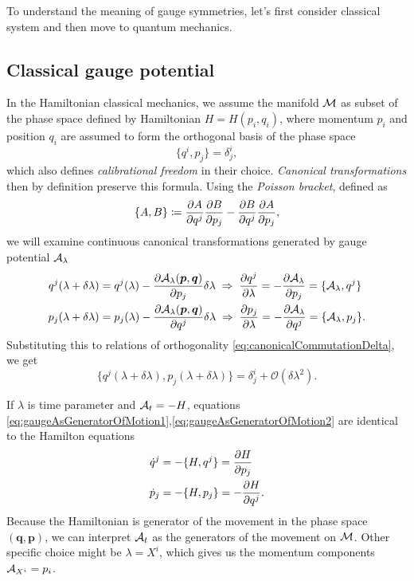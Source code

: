  To understand the meaning of gauge symmetries, let's first consider classical system and then move to quantum mechanics.


\subsection{Classical gauge potential}



In the Hamiltonian classical mechanics, we assume the manifold $\mathcal{M}$ as subset of the phase space defined by Hamiltonian $H=H(p_i,q_i)$, where momentum $p_i$ and position $q_i$ are assumed to form the orthogonal basis of the phase space
\begin{equation}
    \{q^i,p_j\}=\delta^i_j,
    \label{eq:canonicalCommutationDelta}
\end{equation}
which also defines \emph{calibrational freedom} in their choice. \emph{Canonical transformations} then by definition preserve this formula. Using the \emph{Poisson bracket}, defined as
\begin{equation}
    \{A,B\}\coloneqq \frac{\partial A}{\partial q^j}\frac{\partial B}{\partial p_j}-\frac{\partial B}{\partial q^j}\frac{\partial A}{\partial p_j},
\end{equation}
we will examine continuous canonical transformations generated by gauge potential $\mathcal{A}_\lambda$
\begin{align}
        q^j(\lambda+\delta\lambda)&=q^j(\lambda)-\frac{\partial \mathcal{A}_\lambda(\bm{p},\bm{q})}{\partial p_j}\delta\lambda \;\Rightarrow\; \frac{\partial q^j}{\partial \lambda}=-\frac{\partial \mathcal{A}_\lambda}{\partial p_j}=\{\mathcal{A}_\lambda,q^j\}
        \label{eq:gaugeAsGeneratorOfMotion1}\\
        p_j(\lambda+\delta\lambda)&=p_j(\lambda)-\frac{\partial \mathcal{A}_\lambda(\bm{p},\bm{q})}{\partial q^j}\delta\lambda \;\Rightarrow\; \frac{\partial p_j}{\partial \lambda}=-\frac{\partial \mathcal{A}_\lambda}{\partial q^j}=\{\mathcal{A}_\lambda,p_j\}.
        \label{eq:gaugeAsGeneratorOfMotion2}
\end{align}
Substituting this to relations of orthogonality \ref{eq:canonicalCommutationDelta}, we get
\begin{equation}
    \{q^j(\lambda+\delta\lambda),p_j(\lambda+\delta\lambda)\}=\delta^i_j + \mathcal{O}(\delta\lambda^2).
\end{equation}
 
If $\lambda$ is time parameter and $\mathcal{A}_t=-H$, equations \ref{eq:gaugeAsGeneratorOfMotion1},\ref{eq:gaugeAsGeneratorOfMotion2} are identical to the Hamilton equations
\begin{equation}
\begin{split}
    \dot{q}^j&=-\{H,q^j\} = \frac{\partial H}{\partial p_j}\\
    \dot{p}_j&=-\{H,p_j\} = -\frac{\partial H}{\partial q^j}.
\end{split}
\end{equation}
Because the Hamiltonian is generator of the movement in the phase space $(\bm{q},\bm{p})$, we can interpret $\mathcal{A}_t$ as the generators of the movement on $\mathcal{M}$. Other specific choice might be $\lambda=X^i$, which gives us the momentum components $\mathcal{A}_{X^i}=p_i$.

